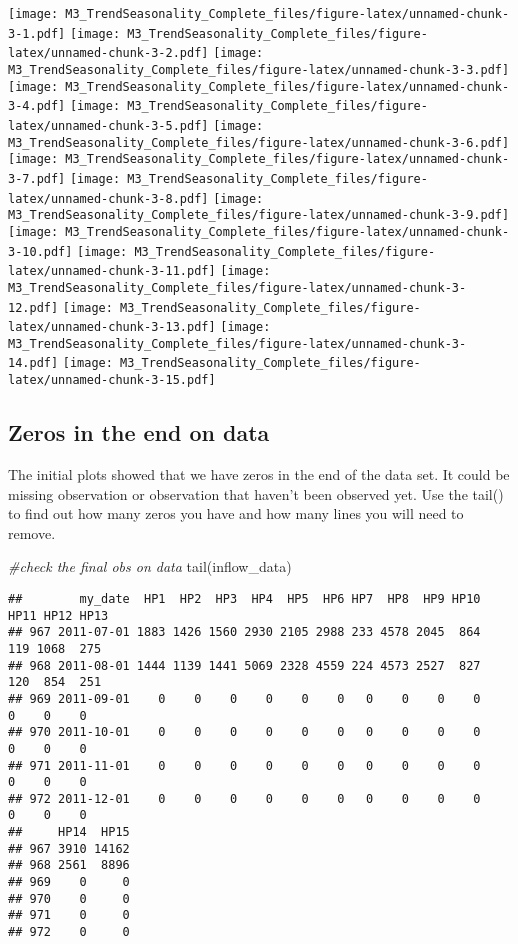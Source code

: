 \documentclass[
]{article}
\newenvironment{Shaded}{\begin{snugshade}}{\end{snugshade}}
\newcommand{\CommentTok}[1]{\textcolor[rgb]{0.56,0.35,0.01}{\textit{#1}}}
\newcommand{\FunctionTok}[1]{\textcolor[rgb]{0.00,0.00,0.00}{#1}}
\newcommand{\NormalTok}[1]{#1}
\begin{document}
\texttt{[image: M3\_TrendSeasonality\_Complete\_files/figure-latex/unnamed-chunk-3-1.pdf]}
\texttt{[image: M3\_TrendSeasonality\_Complete\_files/figure-latex/unnamed-chunk-3-2.pdf]}
\texttt{[image: M3\_TrendSeasonality\_Complete\_files/figure-latex/unnamed-chunk-3-3.pdf]}
\texttt{[image: M3\_TrendSeasonality\_Complete\_files/figure-latex/unnamed-chunk-3-4.pdf]}
\texttt{[image: M3\_TrendSeasonality\_Complete\_files/figure-latex/unnamed-chunk-3-5.pdf]}
\texttt{[image: M3\_TrendSeasonality\_Complete\_files/figure-latex/unnamed-chunk-3-6.pdf]}
\texttt{[image: M3\_TrendSeasonality\_Complete\_files/figure-latex/unnamed-chunk-3-7.pdf]}
\texttt{[image: M3\_TrendSeasonality\_Complete\_files/figure-latex/unnamed-chunk-3-8.pdf]}
\texttt{[image: M3\_TrendSeasonality\_Complete\_files/figure-latex/unnamed-chunk-3-9.pdf]}
\texttt{[image: M3\_TrendSeasonality\_Complete\_files/figure-latex/unnamed-chunk-3-10.pdf]}
\texttt{[image: M3\_TrendSeasonality\_Complete\_files/figure-latex/unnamed-chunk-3-11.pdf]}
\texttt{[image: M3\_TrendSeasonality\_Complete\_files/figure-latex/unnamed-chunk-3-12.pdf]}
\texttt{[image: M3\_TrendSeasonality\_Complete\_files/figure-latex/unnamed-chunk-3-13.pdf]}
\texttt{[image: M3\_TrendSeasonality\_Complete\_files/figure-latex/unnamed-chunk-3-14.pdf]}
\texttt{[image: M3\_TrendSeasonality\_Complete\_files/figure-latex/unnamed-chunk-3-15.pdf]}

\hypertarget{zeros-in-the-end-on-data}{%
\subsection{Zeros in the end on data}\label{zeros-in-the-end-on-data}}

The initial plots showed that we have zeros in the end of the data set.
It could be missing observation or observation that haven't been
observed yet. Use the tail() to find out how many zeros you have and how
many lines you will need to remove.

\begin{Shaded}
\begin{Highlighting}[]
\CommentTok{\#check the final obs on data }
\FunctionTok{tail}\NormalTok{(inflow\_data)}
\end{Highlighting}
\end{Shaded}

\begin{verbatim}
##        my_date  HP1  HP2  HP3  HP4  HP5  HP6 HP7  HP8  HP9 HP10 HP11 HP12 HP13
## 967 2011-07-01 1883 1426 1560 2930 2105 2988 233 4578 2045  864  119 1068  275
## 968 2011-08-01 1444 1139 1441 5069 2328 4559 224 4573 2527  827  120  854  251
## 969 2011-09-01    0    0    0    0    0    0   0    0    0    0    0    0    0
## 970 2011-10-01    0    0    0    0    0    0   0    0    0    0    0    0    0
## 971 2011-11-01    0    0    0    0    0    0   0    0    0    0    0    0    0
## 972 2011-12-01    0    0    0    0    0    0   0    0    0    0    0    0    0
##     HP14  HP15
## 967 3910 14162
## 968 2561  8896
## 969    0     0
## 970    0     0
## 971    0     0
## 972    0     0
\end{verbatim}
\end{document}
